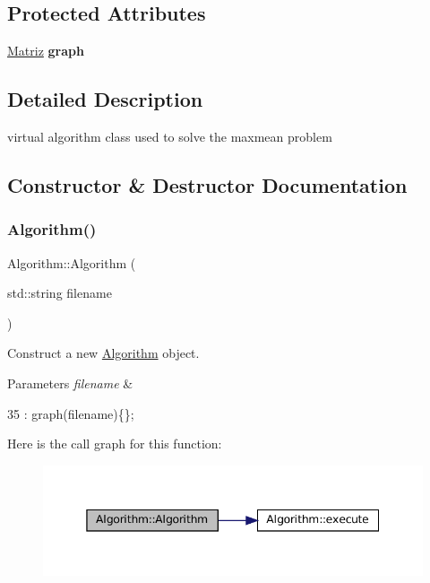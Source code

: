 \subsection*{Protected Attributes}
\begin{DoxyCompactItemize}
\item 
\mbox{\label{classAlgorithm_ac738351f4331aee2fb965f689b7be273}} 
\hyperlink{classMatriz}{Matriz} {\bfseries graph}
\end{DoxyCompactItemize}


\subsection{Detailed Description}
virtual algorithm class used to solve the maxmean problem 

\subsection{Constructor \& Destructor Documentation}
\mbox{\label{classAlgorithm_a89df1d2c6751f70733f38daa0ee2a13b}} 
\subsubsection{\texorpdfstring{Algorithm()}{Algorithm()}}
{\footnotesize\ttfamily Algorithm\+::\+Algorithm (\begin{DoxyParamCaption}\item[{std\+::string}]{filename }\end{DoxyParamCaption})\hspace{0.3cm}{\ttfamily [inline]}}



Construct a new \hyperlink{classAlgorithm}{Algorithm} object. 


\begin{DoxyParams}{Parameters}
{\em filename} & \\
\hline
\end{DoxyParams}

\begin{DoxyCode}
35 : graph(filename)\{\};
\end{DoxyCode}
Here is the call graph for this function\+:
\nopagebreak
\begin{figure}[H]
\begin{center}
\leavevmode
\includegraphics[width=345pt]{classAlgorithm_a89df1d2c6751f70733f38daa0ee2a13b_cgraph}
\end{center}
\end{figure}


